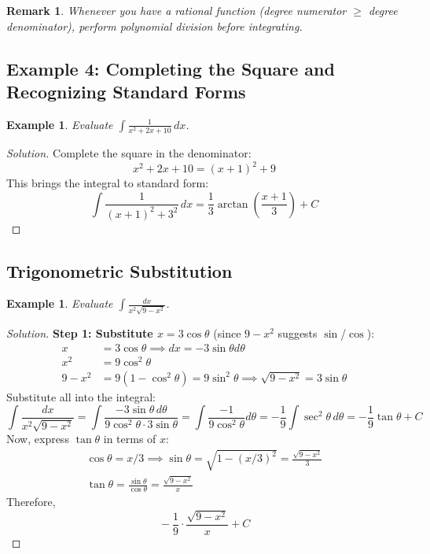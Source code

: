 \documentclass[11pt]{article}
\newtheorem{example}[definition]{Example}
\newtheorem{remark}[definition]{Remark}
\theoremstyle{definition}
\begin{document}
\begin{remark}
Whenever you have a rational function (degree numerator $\geq$ degree denominator), perform polynomial division before integrating.
\end{remark}

\subsection*{Example 4: Completing the Square and Recognizing Standard Forms}

\begin{example}\label{ex:completesquare}
Evaluate $\displaystyle \int \frac{1}{x^2 + 2x + 10}\, dx$.
\end{example}

\begin{proof}[Solution]
Complete the square in the denominator:
\[
x^2 + 2x + 10 = (x + 1)^2 + 9
\]
This brings the integral to standard form:
\[
\int \frac{1}{(x+1)^2 + 3^2}\, dx = \frac{1}{3} \arctan\left( \frac{x+1}{3} \right ) + C
\]
\end{proof}

\subsection{Trigonometric Substitution}

\begin{example}\label{ex:trigsub}
Evaluate $\displaystyle \int \frac{dx}{x^2 \sqrt{9 - x^2}}$.
\end{example}

\begin{proof}[Solution]
\textbf{Step 1: Substitute $x = 3 \cos\theta$} (since $9 - x^2$ suggests $\sin$/$\cos$):
\begin{align*}
x &= 3 \cos\theta \implies dx = -3\sin\theta d\theta \\
x^2 &= 9 \cos^2\theta \\
9 - x^2 &= 9 (1 - \cos^2\theta) = 9 \sin^2\theta \implies \sqrt{9 - x^2} = 3\sin\theta
\end{align*}
Substitute all into the integral:
\[
\int \frac{dx}{x^2 \sqrt{9 - x^2}} 
= \int \frac{-3\sin\theta\, d\theta}{9 \cos^2\theta \cdot 3\sin\theta}
= \int \frac{-1}{9 \cos^2\theta} d\theta = -\frac{1}{9} \int \sec^2\theta\, d\theta
= -\frac{1}{9} \tan\theta + C
\]
Now, express $\tan\theta$ in terms of $x$:
\begin{align*}
\cos\theta = x/3 \implies \sin\theta = \sqrt{1 - (x/3)^2} = \frac{\sqrt{9 - x^2}}{3} \\
\tan\theta = \frac{\sin\theta}{\cos\theta} = \frac{\sqrt{9 - x^2}}{x}
\end{align*}
Therefore,
\[
\boxed{\, -\frac{1}{9} \cdot \frac{\sqrt{9 - x^2}}{x} + C\, }
\]
\end{proof}
\end{document}
